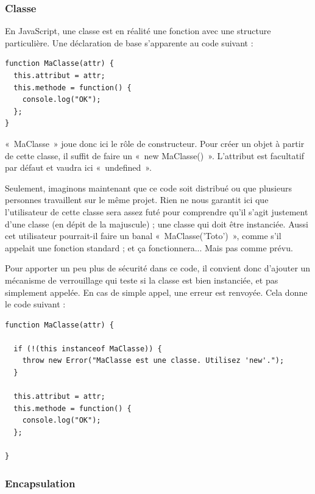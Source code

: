 \documentclass[a4paper,12pt]{article}
\begin{document}
\subsubsection{Classe}

En JavaScript, une classe est en réalité une fonction avec une structure particulière. Une déclaration de base s'apparente au code suivant :

\vspace{7pt}

\begin{lstlisting}
function MaClasse(attr) {
  this.attribut = attr;
  this.methode = function() {
    console.log("OK");
  };
}
\end{lstlisting}

«~MaClasse~» joue donc ici le rôle de constructeur. Pour créer un objet à partir de cette classe, il suffit de faire un «~new MaClasse()~». L'attribut est facultatif par défaut et vaudra ici «~undefined~».

Seulement, imaginons maintenant que ce code soit distribué ou que plusieurs personnes travaillent sur le même projet. Rien ne nous garantit ici que l'utilisateur de cette classe sera assez futé pour comprendre qu'il s'agit justement d'une classe (en dépit de la majuscule) ; une classe qui doit être instanciée. Aussi cet utilisateur pourrait-il faire un banal «~MaClasse('Toto')~», comme s'il appelait une fonction standard ; et ça fonctionnera... Mais pas comme prévu.

Pour apporter un peu plus de sécurité dans ce code, il convient donc d'ajouter un mécanisme de verrouillage qui teste si la classe est bien instanciée, et pas simplement appelée. En cas de simple appel, une erreur est renvoyée. Cela donne le code suivant :

\vspace{7pt}

\begin{lstlisting}
function MaClasse(attr) {

  if (!(this instanceof MaClasse)) {
    throw new Error("MaClasse est une classe. Utilisez 'new'.");
  }
  
  this.attribut = attr;
  this.methode = function() {
    console.log("OK");
  };
  
}
\end{lstlisting}

\subsubsection{Encapsulation}
\end{document}
